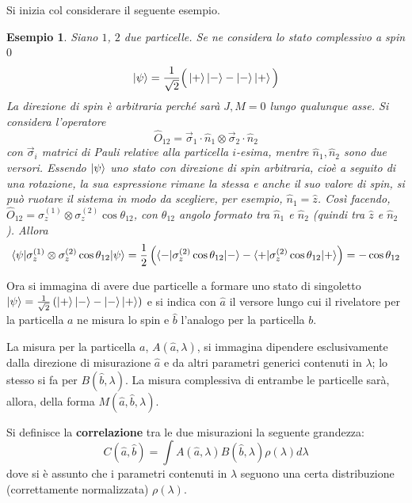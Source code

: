 \documentclass[11pt, a4paper]{scrartcl} %
\numberwithin{equation}{subsection}
\theoremstyle{style2}
\theoremstyle{style1}
\newtheorem{esempio}{Esempio}[section]
\begin{document}
Si inizia col considerare il seguente esempio.
\begin{esempio}
Siano $1$, $2$ due particelle. 
Se ne considera lo stato complessivo a spin $0$ 
\[
\ket{\psi } = \frac{1}{\sqrt{2} } \Big(\ket{+} \ket{-} - \ket{-} \ket{+} \Big)
\] 
La direzione di spin \`e arbitraria perch\'e sar\`a $J,M=0$ lungo qualunque asse. 
Si considera l'operatore 
\[
\hat{O}_{12} = \vec{\sigma }_1 \cdot \hat{n}_1 \otimes \vec{\sigma }_2 \cdot \hat{n}_2
\] 
con $\vec{\sigma }_i$ matrici di Pauli relative alla particella $i$-esima, mentre $\hat{n}_1, \hat{n}_2$ sono due versori.
Essendo $\ket{\psi } $ uno stato con direzione di spin arbitraria, cio\`e a seguito di una rotazione, la sua espressione rimane la stessa e anche il suo valore di spin, si pu\`o ruotare il sistema in modo da scegliere, per esempio, $\hat{n}_1 = \hat{z}$.
Cos\`i facendo, $\hat{O}_{12} = \sigma ^{(1)} _z \otimes \sigma ^{(2)} _z \cos \theta _{12} $, con $\theta _{12} $ angolo formato tra $\hat{n}_1$ e $\hat{n}_2$ (quindi tra $\hat{z}$ e $\hat{n}_2$).
Allora
\[
\braket{\psi |\sigma ^{(1)} _z \otimes \sigma ^{(2)} _z \cos \theta _{12} |\psi } = \frac{1}{2} \left(\braket{-|\sigma ^{(2)} _z \cos\theta _{12} |-} - \braket{+|\sigma ^{(2)} _z \cos \theta _{12} |+} \right) = - \cos \theta _{12} 
\] 
\end{esempio}
Ora si immagina di avere due particelle a formare uno stato di singoletto $\ket{\psi } = \frac{1}{\sqrt{2} } \left(\ket{+} \ket{-} - \ket{-} \ket{+} \right) $ e si indica con $\hat{a}$ il versore lungo cui il rivelatore per la particella $a$ ne misura lo spin e $\hat{b}$ l'analogo per la particella $b$.

La misura per la particella $a$, $A(\hat{a},\lambda )$, si immagina dipendere esclusivamente dalla direzione di misurazione $\hat{a}$ e da altri parametri generici contenuti in $\lambda $; lo stesso si fa per $B(\hat{b}, \lambda )$.
La misura complessiva di entrambe le particelle sar\`a, allora, della forma $M(\hat{a},\hat{b},\lambda )$.

Si definisce la \textbf{correlazione} tra le due misurazioni la seguente grandezza:
\begin{equation}
	C(\hat{a},\hat{b}) = \int A(\hat{a},\lambda ) B (\hat{b},\lambda ) \rho (\lambda ) d\lambda 
\end{equation}
dove si \`e assunto che i parametri contenuti in $\lambda $ seguono una certa distribuzione (correttamente normalizzata) $\rho (\lambda )$.
\end{document}
